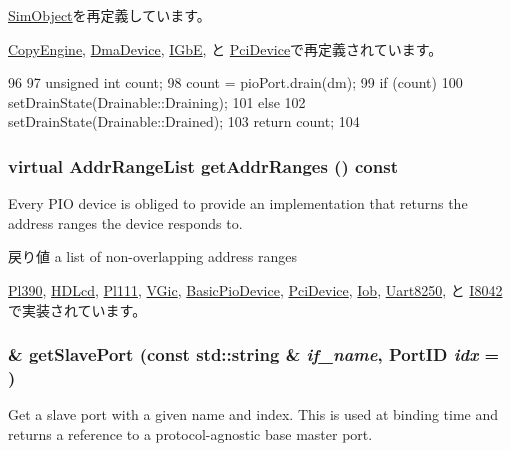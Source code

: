 \hyperlink{classSimObject_a6bf479c521c7c3eb473822d953275b26}{SimObject}を再定義しています。

\hyperlink{classCopyEngine_a6bf479c521c7c3eb473822d953275b26}{CopyEngine}, \hyperlink{classDmaDevice_a6bf479c521c7c3eb473822d953275b26}{DmaDevice}, \hyperlink{classIGbE_aa8a18d230dba7a674ac8a0b4f35bc36a}{IGbE}, と \hyperlink{classPciDevice_aa8a18d230dba7a674ac8a0b4f35bc36a}{PciDevice}で再定義されています。


\begin{DoxyCode}
96 {
97     unsigned int count;
98     count = pioPort.drain(dm);
99     if (count)
100         setDrainState(Drainable::Draining);
101     else
102         setDrainState(Drainable::Drained);
103     return count;
104 }
\end{DoxyCode}
\hypertarget{classPioDevice_a6e967f8921e80748eb2be35b6b481a7e}{
\subsubsection[{getAddrRanges}]{\setlength{\rightskip}{0pt plus 5cm}virtual {\bf AddrRangeList} getAddrRanges () const}}
\label{classPioDevice_a6e967f8921e80748eb2be35b6b481a7e}
Every PIO device is obliged to provide an implementation that returns the address ranges the device responds to.

\begin{DoxyReturn}{戻り値}
a list of non-\/overlapping address ranges 
\end{DoxyReturn}


\hyperlink{classPl390_a36cf113d5e5e091ebddb32306c098fae}{Pl390}, \hyperlink{classHDLcd_a36cf113d5e5e091ebddb32306c098fae}{HDLcd}, \hyperlink{classPl111_a36cf113d5e5e091ebddb32306c098fae}{Pl111}, \hyperlink{classVGic_a36cf113d5e5e091ebddb32306c098fae}{VGic}, \hyperlink{classBasicPioDevice_a36cf113d5e5e091ebddb32306c098fae}{BasicPioDevice}, \hyperlink{classPciDevice_a36cf113d5e5e091ebddb32306c098fae}{PciDevice}, \hyperlink{classIob_a36cf113d5e5e091ebddb32306c098fae}{Iob}, \hyperlink{classUart8250_a36cf113d5e5e091ebddb32306c098fae}{Uart8250}, と \hyperlink{classX86ISA_1_1I8042_a36cf113d5e5e091ebddb32306c098fae}{I8042}で実装されています。\hypertarget{classPioDevice_ac918a145092d7514ebc6dbd952dceafb}{
\subsubsection[{getSlavePort}]{ \& getSlavePort (const std::string \& {\em if\_\-name}, \/  {\bf PortID} {\em idx} = {})}}
\label{classPioDevice_ac918a145092d7514ebc6dbd952dceafb}
Get a slave port with a given name and index. This is used at binding time and returns a reference to a protocol-\/agnostic base master port.


